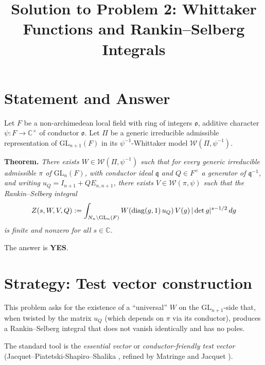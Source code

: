 

\title{Solution to Problem 2: Whittaker Functions and Rankin--Selberg Integrals}
\date{}


\maketitle

\section*{Statement and Answer}

Let $F$ be a non-archimedean local field with ring of integers $\mathfrak o$, additive character $\psi:F\to\mathbb C^\times$ of conductor $\mathfrak o$.  Let $\Pi$ be a generic irreducible admissible representation of $\mathrm{GL}_{n+1}(F)$ in its $\psi^{-1}$-Whittaker model $\mathcal W(\Pi,\psi^{-1})$.

\medskip
\noindent\textbf{Theorem.}  \emph{There exists $W\in\mathcal W(\Pi,\psi^{-1})$ such that for every generic irreducible admissible $\pi$ of $\mathrm{GL}_n(F)$, with conductor ideal $\mathfrak q$ and $Q\in F^\times$ a generator of $\mathfrak q^{-1}$, and writing $u_Q=I_{n+1}+QE_{n,n+1}$, there exists $V\in\mathcal W(\pi,\psi)$ such that the Rankin--Selberg integral
\begin{equation}\label{eq:RS}
Z(s,W,V,Q) := \int_{N_n\backslash\mathrm{GL}_n(F)} W(\operatorname{diag}(g,1)\,u_Q)\,V(g)\,|\det g|^{s-1/2}\,dg
\end{equation}
is finite and nonzero for all $s\in\mathbb C$.}

\medskip
\noindent The answer is \textbf{YES}.

\section*{Strategy: Test vector construction}

This problem asks for the existence of a ``universal'' $W$ on the $\mathrm{GL}_{n+1}$-side that, when twisted by the matrix $u_Q$ (which depends on $\pi$ via its conductor), produces a Rankin--Selberg integral that does not vanish identically and has no poles.

The standard tool is the \emph{essential vector} or \emph{conductor-friendly test vector} (Jacquet--Piatetski-Shapiro--Shalika \cite{JPSS81}, refined by Matringe \cite{Matringe} and Jacquet \cite{JacquetMacdonald}).

